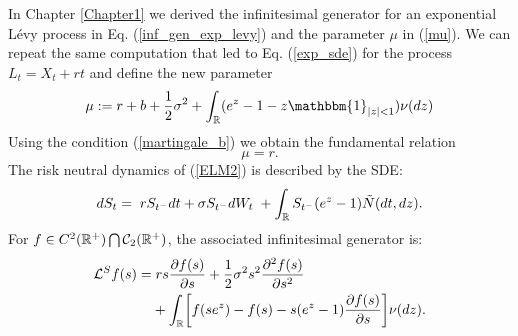 In Chapter \ref{Chapter1} we derived the infinitesimal generator for an exponential Lévy process in Eq. (\ref{inf_gen_exp_levy}) and the 
parameter $\mu$ in (\ref{mu}).
We can repeat the same computation that led to Eq. (\ref{exp_sde}) for the process $L_t = X_t + rt$ and define the new parameter
\begin{equation}\label{mu2}
 \mu := r + b + \frac{1}{2}\sigma^2 + \int_{\R} ( e^{z} - 1 -z\mathbbm{1}_{|z|<1}) \nu(dz)
\end{equation}
Using the condition (\ref{martingale_b}) we obtain the fundamental relation
\begin{equation}\label{mu=r}
 \mu = r.
\end{equation}
The risk neutral dynamics of (\ref{ELM2}) is described by the SDE:
\begin{equation}\label{RN_sde}
 d S_t = \; r S_{t^-} dt +  \sigma S_{t^-} dW_t \; + \int_{\mathbb{R}} S_{t^-} (e^{z} - 1) \tilde N(dt,dz). 
\end{equation}
For $f \in C^{2}(\mathbb{R}^+) \bigcap \mathcal{C}_2(\mathbb{R}^+)$, the associated infinitesimal generator is:
\begin{align}\label{RN_inf_gen}
 \mathcal{L}^S f(s) =& \; r s \frac{\partial f(s)}{\partial s}
+ \frac{1}{2} \sigma^2 s^2 \frac{\partial^2  f(s)}{\partial s^2}  \\ \nonumber
&+ \int_{\mathbb{R}} \biggl[ f(se^z) - f(s) - s(e^z-1)\frac{\partial f(s)}{\partial s} \biggr] \nu(dz).
\end{align}

